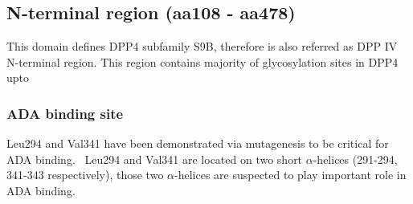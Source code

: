 \subsection{N-terminal region (aa108 - aa478)}

This domain defines DPP4 subfamily S9B, therefore is also referred as DPP IV N-terminal region. This region contains majority of  glycosylation sites in DPP4 upto 

\subsubsection{ADA binding site}
Leu294 and Val341 have been demonstrated via mutagenesis to be critical for ADA binding.~\cite{Abbott_1999} Leu294 and Val341 are located on two short $\alpha$-helices (291-294, 341-343 respectively), those two $\alpha$-helices are suspected to play important role in ADA binding. 